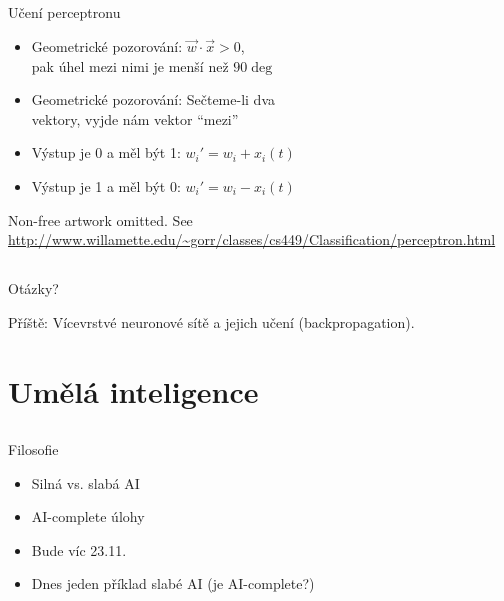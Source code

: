 \documentclass{beamer}
\begin{document}
\subsection{}
\begin{frame}{Učení perceptronu}
\begin{itemize}
\item Geometrické pozorování: $\vec w \cdot \vec x > 0$, \\ pak úhel mezi nimi je menší než $90 \deg$
\item Geometrické pozorování: Sečteme-li dva \\ vektory, vyjde nám vektor ``mezi''
\item Výstup je 0 a měl být 1: $w_i' = w_i + x_i(t)$
\item Výstup je 1 a měl být 0: $w_i' = w_i - x_i(t)$
\end{itemize}

Non-free artwork omitted.
See \url{http://www.willamette.edu/~gorr/classes/cs449/Classification/perceptron.html}
\end{frame}

\subsection{}
\begin{frame}{Otázky?}
\begin{center}
Příště: Vícevrstvé neuronové sítě a jejich učení (backpropagation).
\end{center}
\end{frame}

\section{Umělá inteligence}

\subsection{}
\begin{frame}{Filosofie}
\begin{itemize}
\item Silná vs. slabá AI
\item AI-complete úlohy
\item Bude víc 23.11.
\item Dnes jeden příklad slabé AI (je AI-complete?)
\end{itemize}
\end{frame}
\end{document}
